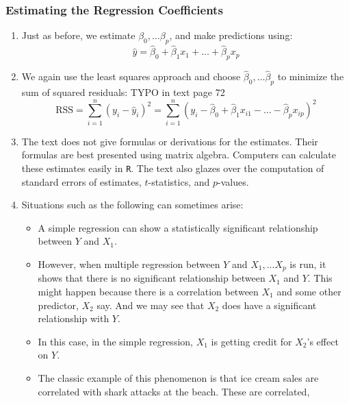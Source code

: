 \documentclass[10pt]{article}
\begin{document}
\subsubsection{Estimating the Regression Coefficients} 
\begin{enumerate}
	\item Just as before, we estimate $\beta_0, \dots \beta_p$, and make predictions using:
	$$\hat y = \hat \beta_0 + \hat \beta_1 x_1 + \dots + \hat \beta_p x_p$$
	\item We again use the least squares approach and choose $\hat \beta_0, \dots \hat \beta_p$ to minimize the sum of squared residuals: {\color{blue} TYPO in text page 72}
	$$ \text{RSS} = \sum_{i = 1}^n (y_i - \hat y_i)^2 = \sum_{i = 1}^n (y_i - \hat \beta_0 + \hat \beta_1 x_{i1} - \dots - \hat\beta_p x_{ip})^2 $$
	\item {\color{brown} The text does not give formulas or derivations for the estimates.  Their formulas are best presented using matrix algebra.  Computers can calculate these estimates easily in {\tt{R}}.  The text also glazes over the computation of standard errors of estimates, $t$-statistics, and $p$-values.}
	\item Situations such as the following can sometimes arise:
	\begin{itemize}
		\item A simple regression can show a statistically significant relationship between $Y$ and $X_1$.
		\item However, when multiple regression between $Y$ and $X_1, ... X_p$ is run, it shows that there is no significant relationship between $X_1$ and $Y$.  This might happen because there is a correlation between $X_1$ and some other predictor, $X_2$ say. And we may see that $X_2$ does have a significant relationship with $Y$. 
		\item In this case, in the simple regression, $X_1$ is getting credit for $X_2$'s effect on $Y$.  
		\item The classic example of this phenomenon is that ice cream sales are correlated with shark attacks at the beach.  These are correlated, 
	\end{itemize}
\end{enumerate}

\vspace{.2in} 
\end{document}
